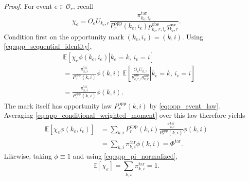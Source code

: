 \documentclass[letterpaper,journal]{IEEEtran}
\begin{document}
\noindent\emph{Proof.}
For event $e\in\mathcal{O}_r$, recall
\begin{equation}
 \chi_e
 =
 O_eU_{k_e,r}
 \frac{
 \pi^{\mathrm{tar}}_{k_e,i_e}
 }{
 P_r^{\mathrm{opp}}(k_e,i_e)
 p^{\mathrm{obs}}_{k_e,r,i_e}
 q^{\mathrm{use}}_{k_e,r}
 }.
 \label{eq:app_chi}
\end{equation}
Condition first on the opportunity mark $(k_e,i_e)=(k,i)$.  Using
\eqref{eq:app_sequential_identity},
\begin{align}
 &\mathbb{E}
 \left[
 \left.
 \chi_e\phi(k_e,i_e)
 \right|
 k_e=k,\,
 i_e=i
 \right]
 \nonumber\\
 &=
 \frac{
 \pi^{\mathrm{tar}}_{k,i}
 }{
 P_r^{\mathrm{opp}}(k,i)
 }
 \phi(k,i)
 \,
 \mathbb{E}
 \left[
 \left.
 \frac{
 O_eU_{k,r}
 }{
 p^{\mathrm{obs}}_{k,r,i}
 q^{\mathrm{use}}_{k,r}
 }
 \right|
 k_e=k,\,
 i_e=i
 \right]
 \nonumber\\
 &=
 \frac{
 \pi^{\mathrm{tar}}_{k,i}
 }{
 P_r^{\mathrm{opp}}(k,i)
 }
 \phi(k,i).
 \label{eq:app_conditional_weighted_moment}
\end{align}
The mark itself has opportunity law
$P_r^{\mathrm{opp}}(k,i)$ by
\eqref{eq:opp_event_law}.  Averaging
\eqref{eq:app_conditional_weighted_moment} over this law therefore yields
\begin{align}
 \mathbb{E}
 \left[
 \chi_e\phi(k_e,i_e)
 \right]
 &=
 \sum_{k,i}
 P_r^{\mathrm{opp}}(k,i)
 \frac{
 \pi^{\mathrm{tar}}_{k,i}
 }{
 P_r^{\mathrm{opp}}(k,i)
 }
 \phi(k,i)
 \nonumber\\
 &=
 \sum_{k,i}
 \pi^{\mathrm{tar}}_{k,i}\phi(k,i)
 =
 \Phi^{\mathrm{tar}}.
 \label{eq:app_expected_numerator_event}
\end{align}
Likewise, taking $\phi\equiv1$ and using
\eqref{eq:app_pi_normalized},
\begin{equation}
    \mathbb{E}[\chi_e]
    =
    \sum_{k,i}\pi^{\mathrm{tar}}_{k,i}
    =1.
    \label{eq:app_expected_denominator_event}
\end{equation}
\end{document}
